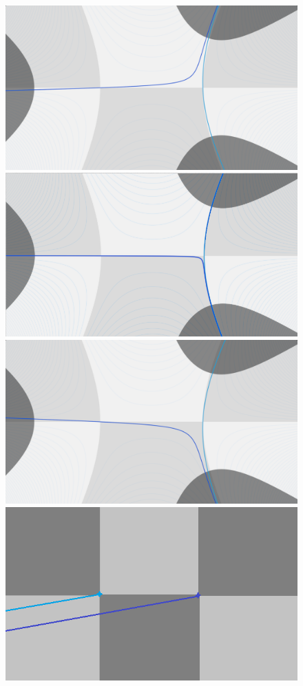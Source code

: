 \documentclass[11pt,a4paper,twoside,leqno,noamsfonts]{amsart}
\numberwithin{equation}{section}
\begin{document}
\begin{figure}[h]
\includegraphics[scale=0.065]{veer-left_matching}
\includegraphics[scale=0.26]{thimble-degenerate}
\includegraphics[scale=0.065]{veer-right_matching}
\includegraphics[scale=0.33]{borel-left}

\end{figure}
\end{document}
